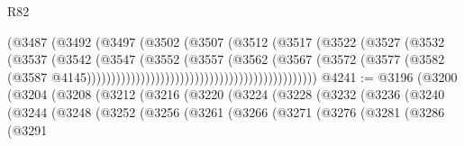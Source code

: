 \begin{lexlean}{R82}
\begin{coremodule}
                                                        (@3487
                                                          (@3492
                                                            (@3497
                                                              (@3502
                                                                (@3507
                                                                  (@3512
                                                                    (@3517
                                                                      (@3522
                                                                        (@3527
                                                                          (@3532
                                                                            (@3537
                                                                              (@3542
                                                                                (@3547
                                                                                  (@3552
                                                                                    (@3557
                                                                                      (@3562
                                                                                        (@3567
                                                                                          (@3572
                                                                                            (@3577
                                                                                              (@3582
                                                                                                (@3587
                                                                                                  @4145)))))))))))))))))))))))))))))))))))))))))))))))
@4241 := @3196
    (@3200
      (@3204
        (@3208
          (@3212
            (@3216
              (@3220
                (@3224
                  (@3228
                    (@3232
                      (@3236
                        (@3240
                          (@3244
                            (@3248
                              (@3252
                                (@3256
                                  (@3261
                                    (@3266
                                      (@3271
                                        (@3276
                                          (@3281
                                            (@3286
                                              (@3291

\end{coremodule}
\end{lexlean}
